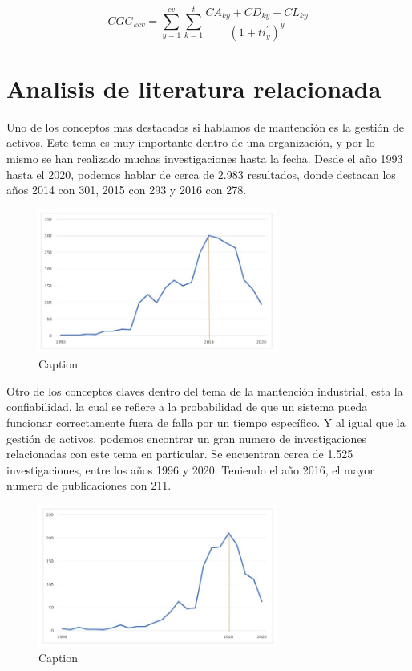 \documentclass[]{article}
\begin{document}
\begin{equation}
    CGG_{kcv} = \sum_{y=1}^{cv}\sum_{k=1}^{t}\frac{CA_{ky} + CD_{ky} + CL_{ky}}{{(1 +ti_{y}^{\prime})}^{y}}
\end{equation}




\hypertarget{analisis-literatura-relacionada}{
\section{Analisis de literatura relacionada }
\label{analisis-literatura-relacionada}}

Uno de los conceptos mas destacados si hablamos de mantención es la gestión de activos. Este tema es muy importante dentro de una organización, y por lo mismo se han realizado muchas investigaciones hasta la fecha.
Desde el año 1993 hasta el 2020, podemos hablar de cerca de 2.983 resultados, donde destacan los años 2014 con 301, 2015 con 293 y 2016 con 278.

\newpage
\begin{figure}[!h]
    \centering
    \includegraphics[width=0.7\textwidth]{1.JPG}
    \caption{Caption}
    \label{fig:my_label}
\end{figure}

Otro de los conceptos claves dentro del tema de la mantención industrial, esta la confiabilidad, la cual se refiere a la probabilidad de que un sistema pueda funcionar correctamente fuera de falla por un tiempo específico. Y al igual que la gestión de activos, podemos encontrar un gran numero de investigaciones relacionadas con este tema en particular. Se encuentran cerca de 1.525 investigaciones, entre los años 1996 y 2020. Teniendo el año 2016, el mayor numero de publicaciones con 211.

\begin{figure}[!h]
    \centering
    \includegraphics[width=0.7\textwidth]{2.JPG}
    \caption{Caption}
    \label{fig:my_label}
\end{figure}
\end{document}
